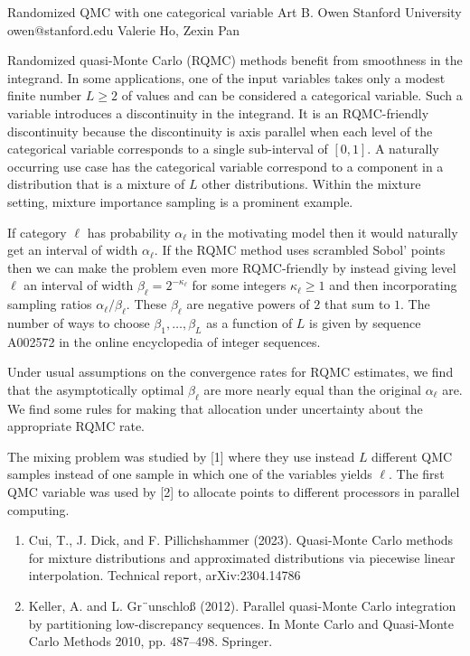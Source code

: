 \begin{talk}
  {Randomized QMC with one categorical variable}%
  {Art B. Owen}%
  {Stanford University}%
  {owen@stanford.edu}%
  {Valerie Ho, Zexin Pan}%
  
    
   
  Randomized quasi-Monte Carlo (RQMC) methods benefit from smoothness
  in the integrand.  In some applications, one of the input variables takes
  only a modest finite number $L\geqslant2$
of values and can be considered a categorical
  variable. Such a variable introduces a discontinuity in the integrand.  It is
  an RQMC-friendly discontinuity because the discontinuity is axis parallel
  when each level of the categorical variable corresponds to a single
  sub-interval of $[0,1]$.  A naturally occurring use case has
  the categorical variable correspond to a component in a distribution
  that is a mixture of $L$ other distributions.  Within the mixture
  setting, mixture importance sampling is a prominent example.

 If category $\ell$  has probability $\alpha_\ell$ in the motivating
  model then it would naturally get an interval of width $\alpha_\ell$.
If the RQMC method uses scrambled Sobol' points
then we can make the problem even more RQMC-friendly by instead giving
  level $\ell$ an interval of width $\beta_\ell = 2^{-\kappa_\ell}$
  for some integers $\kappa_\ell \geqslant1$ and then
  incorporating sampling ratios $\alpha_\ell/\beta_\ell$.
  These $\beta_\ell$ are negative powers of $2$ that sum to $1$.
  The number of ways to choose $\beta_1,\dots,\beta_L$
  as a function of $L$ is given by sequence A002572 in the
  online encyclopedia of integer sequences.

  Under usual assumptions on the convergence rates for RQMC
  estimates, we find that the asymptotically optimal $\beta_\ell$
  are more nearly equal than the original $\alpha_\ell$ are.
  We find some rules for making that  allocation under uncertainty
  about the appropriate RQMC rate.

  The mixing problem was studied by [1] where they use instead
  $L$ different QMC samples instead of one sample in which
  one of the variables yields $\ell$. The first QMC variable
  was used by [2] to allocate points to different processors
  in parallel computing.

\medskip
\begin{enumerate}
 \item[{[1]}] Cui, T., J. Dick, and F. Pillichshammer (2023). Quasi-Monte Carlo methods
for mixture distributions and approximated distributions via piecewise linear
interpolation. Technical report, arXiv:2304.14786 
\item[{[2]}]
Keller, A. and L. Gr¨unschlo{\ss} (2012). Parallel quasi-Monte Carlo integration by
partitioning low-discrepancy sequences. In Monte Carlo and Quasi-Monte
Carlo Methods 2010, pp. 487--498. Springer.
\end{enumerate}

\end{talk}

